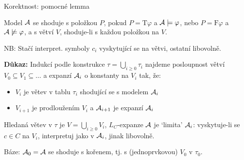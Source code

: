 \documentclass{beamer}
\begin{document}
\begin{frame}{Korektnost: pomocné lemma}

    \vspace{-6pt}
    Model $\mathcal{A}$ se \alert{shoduje} \alert{s položkou $P$}, pokud
    $P=\mathrm{T}\varphi$ a $\mathcal{A}\models\varphi$, nebo $P=\mathrm{F}\varphi$ a $\mathcal{A}\not\models\varphi$, a \alert{s větví $V$}, shoduje-li s každou položkou na $V$.
    
    \smallskip

    
    {\small NB: Stačí interpret. symboly $c_i$ vyskytující se na větvi, ostatní libovolně.}
   
    \textbf{Důkaz:}
    Indukcí podle konstrukce $\tau=\bigcup_{i\geq 0}\tau_i$ najdeme  posloupnost větví $V_0\subseteq V_1\subseteq\dots$ a expanzí $\mathcal{A}_i$ o konstanty na $V_i$ tak, že:
     \begin{itemize}
        \item $V_i$ je větev v tablu $\tau_i$ shodující se s modelem $\mathcal{A}_i$
        \item $V_{i+1}$ je prodloužením $V_i$ a $\mathcal{A}_{i+1}$ je expanzí $\mathcal{A}_i$
     \end{itemize}
    Hledaná větev v $\tau$ je $V=\bigcup_{i\geq 0}V_i$, $L_C$-expanze $\mathcal{A}$ je `limita' $\mathcal{A}_i$: vyskytuje-li se $c\in C$ na $V_i$, interpretuj jako v $\mathcal{A}_i$, jinak libovolně.

    \alert{Báze:} $\mathcal{A}_0=\mathcal{A}$ se shoduje s kořenem, tj. s (jednoprvkovou) $V_0$ v $\tau_0$.

\end{frame}
\end{document}
